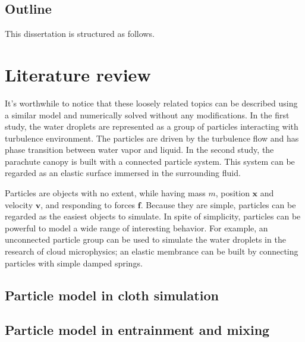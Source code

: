 \section{Outline}
This dissertation is structured as follows.

\chapter{Literature review}
It's worthwhile to notice that these loosely related topics can be described 
using a similar model and numerically solved without any modifications. 
In the first study, the water droplets are represented as a group of particles interacting 
with turbulence environment. The particles are driven by the turbulence flow and has phase 
transition between water vapor and liquid. In the second study, the parachute canopy is built 
with a connected particle system. This system can be regarded as an elastic surface immersed in 
the surrounding fluid.

Particles are objects with no extent, while having mass $m$, position
$\mathbf{x}$ and velocity $\mathbf{v}$, and responding to forces $\mathbf{f}$.
Because they are simple, particles can be regarded as the easiest objects to
simulate. In spite of simplicity, particles can be powerful to model a
wide range of interesting behavior. For example, an unconnected particle group
can be used to simulate the water droplets in the research of cloud
microphysics; an elastic membrance can be built by connecting particles with
simple damped springs. 
\section{Particle model in cloth simulation}
 

\section{Particle model in entrainment and mixing}

